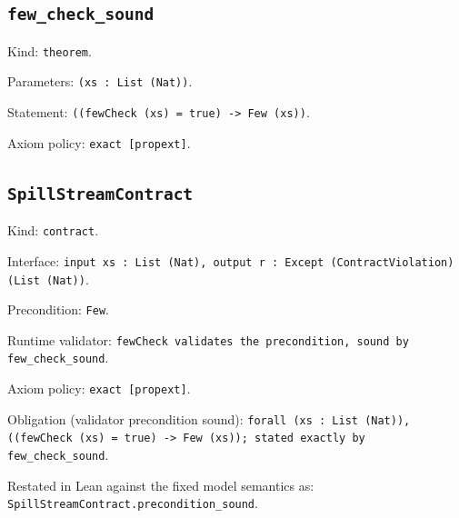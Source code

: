 \documentclass[11pt]{article}
\begin{document}
\subsection*{\texttt{few\_check\_sound}}
\noindent Kind: \texttt{theorem}.\par
\noindent Parameters: \texttt{(xs : List (Nat))}.\par
\noindent Statement: \texttt{((fewCheck (xs) = true) -> Few (xs))}.\par
\noindent Axiom policy: \texttt{exact [propext]}.\par
\subsection*{\texttt{SpillStreamContract}}
\noindent Kind: \texttt{contract}.\par
\noindent Interface: \texttt{input xs : List (Nat), output r : Except (ContractViolation) (List (Nat))}.\par
\noindent Precondition: \texttt{Few}.\par
\noindent Runtime validator: \texttt{fewCheck validates the precondition, sound by few\_check\_sound}.\par
\noindent Axiom policy: \texttt{exact [propext]}.\par
\noindent Obligation (validator precondition sound): \texttt{forall (xs : List (Nat)), ((fewCheck (xs) = true) -> Few (xs)); stated exactly by few\_check\_sound}.\par
\noindent Restated in Lean against the fixed model semantics as: \texttt{SpillStreamContract.precondition\_sound}.\par
\end{document}
